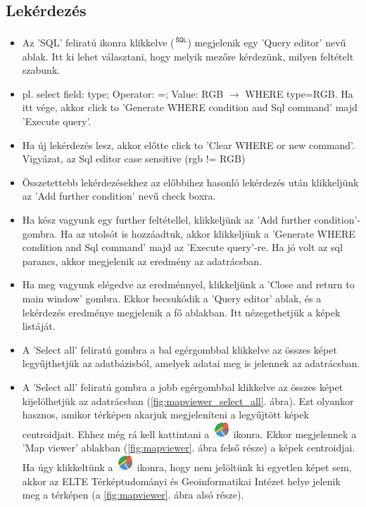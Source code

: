 \documentclass[a4paper,12pt]{article}
\begin{document}
\subsection{Lekérdezés}

\begin{itemize}
	\item  Az 'SQL' feliratú ikonra klikkelve (\includegraphics[width=0.5cm]{sql.png}) megjelenik egy 'Query editor' nevű ablak. Itt ki lehet választani, hogy melyik mezőre kérdezünk, milyen feltételt szabunk.
	
	\item pl. select field: type;  Operator: =; Value: RGB $\rightarrow$ 
	WHERE type=RGB. Ha itt vége, akkor click to 'Generate WHERE condition and Sql command' majd 'Execute query'. 
	
	\item Ha új lekérdezés lesz, akkor előtte click to 'Clear WHERE or new command'. Vigyázat, az Sql editor case sensitive (rgb !=  RGB)
	
	\item Összetettebb lekérdezésekhez az előbbihez hasonló lekérdezés után klikkeljünk az 'Add further condition' nevű check boxra. 
	
	\item Ha kész vagyunk egy further feltétellel, klikkeljünk az 'Add further condition'- gombra. Ha az utolsót is hozzáadtuk, akkor klikkeljünk a 'Generate WHERE condition and Sql command' majd az 'Execute query'-re. Ha jó volt az sql parancs, akkor megjelenik az eredmény az adatrácsban.
	
	\item Ha meg vagyunk elégedve az eredménnyel, klikkeljünk a 'Close and return to main window' gombra. Ekkor becsukódik a 'Query editor' ablak, és a lekérdezés eredménye megjelenik a fő ablakban. Itt nézegethetjük a képek listáját.
	
	\item A 'Select all' feliratú gombra a bal egérgombbal klikkelve az összes képet legyűjthetjük az adatbázisból, amelyek adatai meg is jelennek az adatrácsban.
	
	\item A 'Select all' feliratú gombra a jobb egérgombbal klikkelve az összes képet kijelölhetjük az  adatrácsban (\ref{fig:mapviewer_select_all}. ábra). Ezt olyankor hasznos, amikor térképen akarjuk megjeleníteni a legyűjtött képek centroidjait. Ehhez még rá kell kattintani a \includegraphics[width = 0.5 cm]{mapviewer_ikon.png} ikonra. Ekkor megjelennek a 'Map viewer' ablakban (\ref{fig:mapviewer}. ábra felső része) a képek centroidjai. Ha úgy klikkeltünk a \includegraphics[width = 0.5 cm]{mapviewer_ikon.png} ikonra, hogy nem jelöltünk ki egyetlen képet sem, akkor az ELTE Térképtudományi és Geoinformatikai Intézet helye jelenik meg a térképen (a \ref{fig:mapviewer}. ábra alsó része).
	

\end{itemize}
\end{document}
